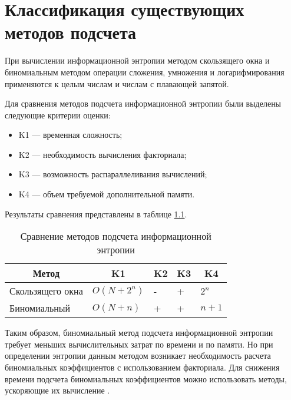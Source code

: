 \chapter{Классификация существующих методов подсчета}

При вычислении информационной энтропии методом скользящего окна и биномиальным методом операции сложения, умножения и логарифмирования применяются к целым числам и числам с плавающей запятой.

Для сравнения методов подсчета информационной энтропии были выделены следующие критерии оценки:

\begin{itemize}
	\item K1 --- временная сложность;
	\item K2 --- необходимость вычисления факториала;
	\item K3 --- возможность распараллеливания вычислений;
	\item K4 --- объем требуемой дополнительной памяти.
\end{itemize}

Результаты сравнения представлены в таблице \ref{tab:comparison}.

\begin{table}[h]
    \caption{Сравнение методов подсчета информационной энтропии}
    \begin{center}
        \begin{tabular}{|l|l|l|l|l|}
        		\hline
            \multicolumn{1}{|c}{\textbf{Метод}} & 
            \multicolumn{1}{|c|}{\textbf{K1}} &
            \multicolumn{1}{c|}{\textbf{K2}} &
            \multicolumn{1}{c|}{\textbf{K3}} & 
            \multicolumn{1}{c|}{\textbf{K4}} \\ \hline
            Скользящего окна &  $O(N + 2^n)$ & - & + & $2^n$ \\ \hline
            Биномиальный &  $O(N + n)$ & + & + & $n + 1$ \\ \hline
        \end{tabular}
    \end{center}
    \label{tab:comparison}
\end{table}

Таким образом, биномиальный метод подсчета информационной энтропии требует меньших вычислительных затрат по времени и по памяти. Но при определении энтропии данным методом возникает необходимость расчета биномиальных коэффициентов с использованием факториала. Для снижения времени подсчета биномиальных коэффициентов можно использовать методы, ускоряющие их вычисление \cite{binomial-method}.